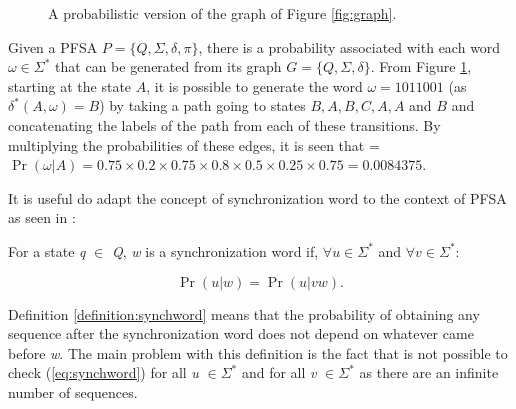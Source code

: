 {\begin{figure}
\centering
{}
\caption{A probabilistic version of the graph of Figure \ref{fig:graph}.\label{fig:pfsa}}
\end{figure}

Given a PFSA $P=\{Q, \Sigma, \delta, \pi\}$, there is a probability associated with each word $\omega \in \Sigma^*$ that can be generated from its graph $G=\{Q,\Sigma,\delta\}$. From Figure \ref{fig:pfsa}, starting at the state $A$, it is possible to generate the word $\omega = 1011001$ (as $\delta^*(A, \omega) = B$) by taking a path going to states $B,A,B,C,A,A$ and $B$ and concatenating the labels of the path from each of these transitions. By multiplying the probabilities of these edges, it is seen that  = $\Pr (\omega |A) = 0.75\times0.2\times0.75\times0.8\times0.5\times0.25\times0.75 = 0.0084375$.

It is useful do adapt the concept of synchronization word to the context of PFSA as seen in \citep{asok.11}:

\begin{definition}\label{definition:synchword}
For a state \textit{q} $\in$ \textit{Q}, \textit{w} is a synchronization word if, $\forall \textit{u} \in \Sigma^*$ and $\forall \textit{v} \in \Sigma^*$:

\begin{equation}
\Pr(\textit{u}|\textit{w}) = \Pr(\textit{u}|\textit{vw}).
\label{eq:synchword}
\end{equation}
\end{definition}

Definition \ref{definition:synchword} means that the probability of obtaining any sequence after the synchronization word does not depend on whatever came before \textit{w}. The main problem with this definition is the fact that is not possible to check (\ref{eq:synchword}) for all \textit{u} $\in \Sigma^*$ and for all \textit{v} $\in \Sigma^*$ as there are an infinite number of sequences.

}
